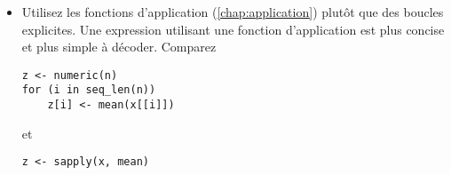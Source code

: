 \begin{itemize}
\begin{Schunk}
\begin{Verbatim}
if (!all(!is.na(x)))
\end{Verbatim}
  \end{Schunk}
  En revanche, s'il s'agit plutôt d'exécuter une expression quand un
  vecteur ne contient pas de données manquantes, alors
  \begin{Schunk}
\begin{Verbatim}
if (all(!is.na(x)))
\end{Verbatim}
  \end{Schunk}
  est plus simple que
  \begin{Schunk}
\begin{Verbatim}
if (!any(is.na(x)))
\end{Verbatim}
  \end{Schunk}

  De plus, le conseil précédent sur la priorité des opérations est
  particulièrement indiqué avec les opérations logiques. Sauriez-vous
  confirmer, sans consulter le \autoref{tab:bases:operateurs}, l'ordre
  des opérations dans l'expression logique suivante?\footnote{%
    C'est .}
  \begin{Schunk}
\begin{Verbatim}
!p | q & r
\end{Verbatim}
  \end{Schunk}
\item Utilisez les fonctions d'application
  (\autoref{chap:application}) plutôt que des boucles explicites. Une
  expression utilisant une fonction d'application est plus concise et
  plus simple à décoder. Comparez
  \begin{Schunk}
\begin{Verbatim}
z <- numeric(n)
for (i in seq_len(n))
    z[i] <- mean(x[[i]])
\end{Verbatim}
  \end{Schunk}
  et
  \begin{Schunk}
\begin{Verbatim}
z <- sapply(x, mean)
\end{Verbatim}
  \end{Schunk}


\end{itemize}
